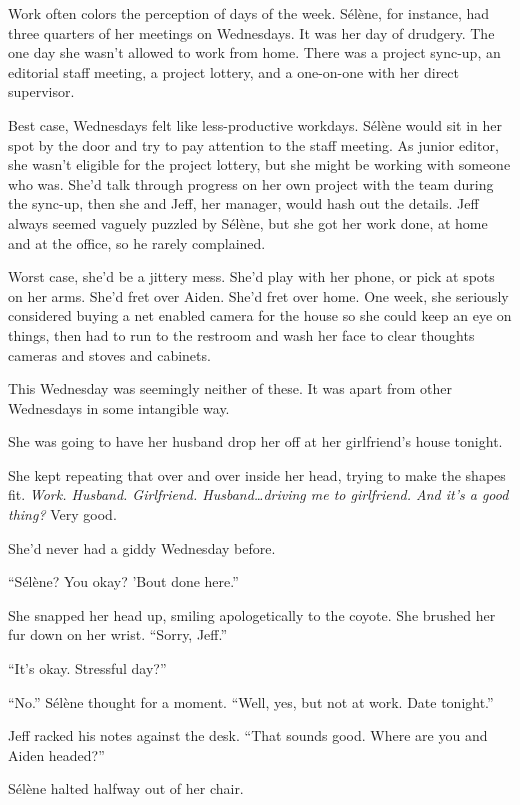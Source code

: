 \secdiv{}

\noindent Work often colors the perception of days of the week. Sélène, for instance, had three quarters of her meetings on Wednesdays. It was her day of drudgery. The one day she wasn't allowed to work from home. There was a project sync-up, an editorial staff meeting, a project lottery, and a one-on-one with her direct supervisor.

Best case, Wednesdays felt like less-productive workdays. Sélène would sit in her spot by the door and try to pay attention to the staff meeting. As junior editor, she wasn't eligible for the project lottery, but she might be working with someone who was. She'd talk through progress on her own project with the team during the sync-up, then she and Jeff, her manager, would hash out the details. Jeff always seemed vaguely puzzled by Sélène, but she got her work done, at home and at the office, so he rarely complained.

Worst case, she'd be a jittery mess. She'd play with her phone, or pick at spots on her arms. She'd fret over Aiden. She'd fret over home. One week, she seriously considered buying a net enabled camera for the house so she could keep an eye on things, then had to run to the restroom and wash her face to clear thoughts cameras and stoves and cabinets.

This Wednesday was seemingly neither of these. It was apart from other Wednesdays in some intangible way.

She was going to have her husband drop her off at her girlfriend's house tonight.

She kept repeating that over and over inside her head, trying to make the shapes fit. \emph{Work. Husband. Girlfriend. Husband\ldots{}driving me to girlfriend. And it's a good thing?} Very good.

She'd never had a giddy Wednesday before.

``Sélène? You okay? 'Bout done here.''

She snapped her head up, smiling apologetically to the coyote. She brushed her fur down on her wrist. ``Sorry, Jeff.''

``It's okay. Stressful day?''

``No.'' Sélène thought for a moment. ``Well, yes, but not at work. Date tonight.''

Jeff racked his notes against the desk. ``That sounds good. Where are you and Aiden headed?''

Sélène halted halfway out of her chair.

